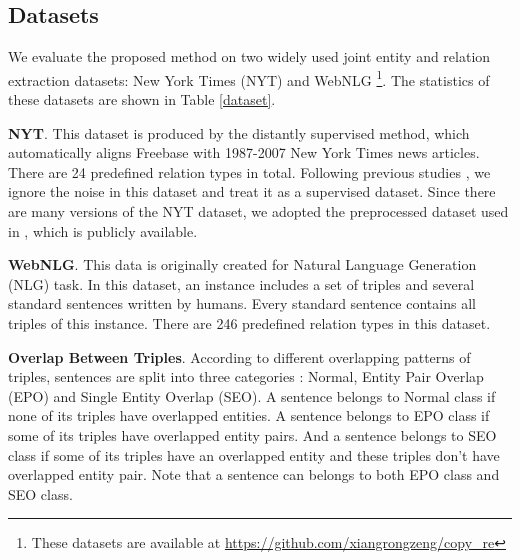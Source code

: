 \documentclass[letterpaper]{article} \usepackage{aaai21}  \usepackage{times}  \usepackage{helvet} \usepackage{courier}  \usepackage[hyphens]{url}  \usepackage{graphicx} \usepackage{amsfonts,amssymb}
\begin{document}
\subsection{Datasets}
We evaluate the proposed method on two widely used joint entity and relation extraction datasets: New York Times (NYT) \cite{riedel2010modeling} and WebNLG \cite{gardent2017creating} \footnote{These datasets are available at \url{https://github.com/xiangrongzeng/copy_re}}. The statistics of these datasets are shown in Table \ref{dataset}.

\textbf{NYT}. This dataset is produced by the distantly supervised method, which automatically aligns Freebase with 1987-2007 New York Times news articles. There are 24 predefined relation types in total. Following previous studies \cite{zheng2017joint,zeng2018extracting}, we ignore the noise in this dataset and treat it as a supervised dataset. Since there are many versions of the NYT dataset, we adopted the preprocessed dataset used in \citet{zeng2018extracting}, which is publicly available. 

\textbf{WebNLG}. This data is originally created for Natural Language Generation (NLG) task. In this dataset, an instance includes a set of triples and several standard sentences written by humans. Every standard sentence contains all triples of this instance. There are 246 predefined relation types in this dataset. 

\textbf{Overlap Between Triples}. According to different overlapping patterns of triples, sentences are split into three categories \cite{zeng2018extracting}: Normal, Entity Pair Overlap (EPO) and Single Entity Overlap (SEO). A sentence belongs to Normal class if none of its triples have overlapped entities. A sentence belongs to EPO class if some of its triples have overlapped entity pairs. And a sentence belongs to SEO class if some of its triples have an overlapped entity and these triples don’t have overlapped entity pair. Note that a sentence
can belongs to both EPO class and SEO class.
\begin{table}[h]
\begin{center}
\caption{The statistics of NYT and WebNLG.}
\label{dataset}
\end{center}
\end{table}
\end{document}
